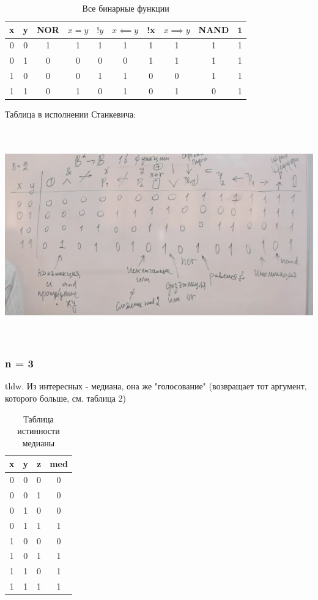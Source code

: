 \documentclass{article}
\begin{document}
\begin{table}
    \centering
    \begin{tabular}{ |c|c|c|c|c|c|c|c|c|c| }
        \hline
         x & y & NOR & $x = y$ & $!y$ & $x \impliedby y$ & !x & $x \implies y$ & NAND & $\mathbf{1}$ \\
         \hline
         0 & 0 & 1 & 1 & 1 & 1 & 1 & 1 & 1 & 1 \\
         0 & 1 & 0 & 0 & 0 & 0 & 1 & 1 & 1 & 1 \\
         1 & 0 & 0 & 0 & 1 & 1 & 0 & 0 & 1 & 1 \\
         1 & 1 & 0 & 1 & 0 & 1 & 0 & 1 & 0 & 1 \\
         \hline
    \end{tabular}
    \caption{Все бинарные функции}
    \label{tab:my_label}
\end{table}

Таблица в исполнении Станкевича:
\begin{center}
  \includegraphics[height=9.1cm]{2-2-1.png}
\end{center}

\subsubsection{n = 3}
tldw.
Из интересных - медиана, она же "голосование" (возвращает тот аргумент, которого больше, см. таблица 2)


\begin{table}
    \centering
    \begin{tabular}{ |c|c|c|c| }
        \hline
         x & y & z & med \\
        \hline
         0 & 0 & 0 & 0 \\
         0 & 0 & 1 & 0 \\
         0 & 1 & 0 & 0 \\
         0 & 1 & 1 & 1 \\
         1 & 0 & 0 & 0 \\
         1 & 0 & 1 & 1 \\
         1 & 1 & 0 & 1 \\
         1 & 1 & 1 & 1 \\
        \hline
    \end{tabular}
    \caption{Таблица истинности медианы}
\end{table}
\end{document}
